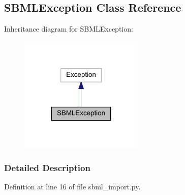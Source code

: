 \hypertarget{classamici_1_1sbml__import_1_1_s_b_m_l_exception}{}\subsection{S\+B\+M\+L\+Exception Class Reference}
\label{classamici_1_1sbml__import_1_1_s_b_m_l_exception}


Inheritance diagram for S\+B\+M\+L\+Exception\+:
\nopagebreak
\begin{figure}[H]
\begin{center}
\leavevmode
\includegraphics[width=167pt]{classamici_1_1sbml__import_1_1_s_b_m_l_exception__inherit__graph}
\end{center}
\end{figure}


\subsubsection{Detailed Description}


Definition at line 16 of file sbml\+\_\+import.\+py.

